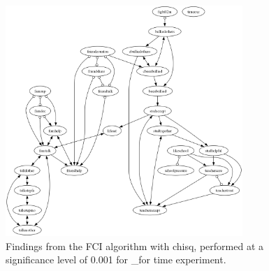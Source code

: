 \begin{figure}[htbp]
    \centering
    \includegraphics[width=0.8\textwidth]{Report/final_report/pictures/FCI_chisq_0.001__for time experiment.png}
    \caption{Findings from the FCI algorithm with chisq, performed at a significance level of 0.001 for _for time experiment.}
    \label{fig:fci_chisq_0.001_for time experiment}
\end{figure}
